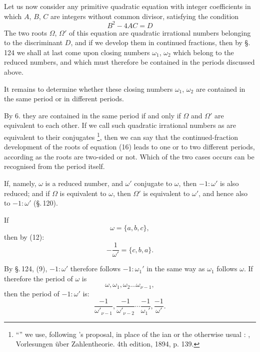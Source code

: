 Let us now consider any primitive quadratic equation with
integer coefficients
in which $A$, $B$, $C$ are integers without common divisor,
satisfying the condition
\[
B^2 - 4AC = D
\]
The two roots $\Omega$, $\Omega'$ of this equation are quadratic
irrational numbers belonging to the discriminant $D$, and
if we develop them in continued fractions, then by
\S.\,124 we shall at last come upon closing numbers $\omega_1$, $\omega_2$ which belong to the reduced
numbers, and which must therefore be contained in the periods
discussed above.

It remains to determine whether these closing numbers $\omega_1$, $\omega_2$ are
contained in the same period or in different periods.

By 6. they are contained in the same period if and only
if $\Omega$ and $\Omega'$ are equivalent to each other. If we call
such quadratic irrational numbers as are equivalent to their conjugates
\footnote{``'' we use, following 's proposal, in place of the
ian  or the otherwise usual : , Vorlesungen über Zahlentheorie. 4th edition, 1894, p. 139.}, then we can
say that the continued-fraction development of the roots of
equation (16) leads to one or to two different periods,
according as the roots are two-sided or not.
Which of the two cases occurs can be recognised from the period
itself.

If, namely, $\omega$ is a reduced number, and $\omega'$ conjugate
to $\omega$, then $-1 : \omega'$ is also reduced; and if $\Omega$ is equivalent
to $\omega$, then $\Omega'$ is equivalent to $\omega'$, and hence also to $-1 : \omega'$ (\S.\,120).

If
\[
\omega = \{a, b, c\},
\]
then by (12):
\[
-\frac{1}{\omega'} = \{c, b, a\}.
\]

By \S.\,124, (9), $-1 : \omega'$ therefore follows $-1 : \omega_1'$
in the same way as $\omega_1$ follows $\omega$. If therefore the period of $\omega$ is
\[
\omega, \omega_1, \omega_2 \ldots \omega_{\nu-1},
\]
then the period of $-1 : \omega'$ is:
\[
\frac{-1}{\omega'_{\nu-1}}, \frac{-1}{\omega'_{\nu-2}} \cdots \frac{-1}{\omega_1'}, \frac{-1}{\omega'}.
\]
